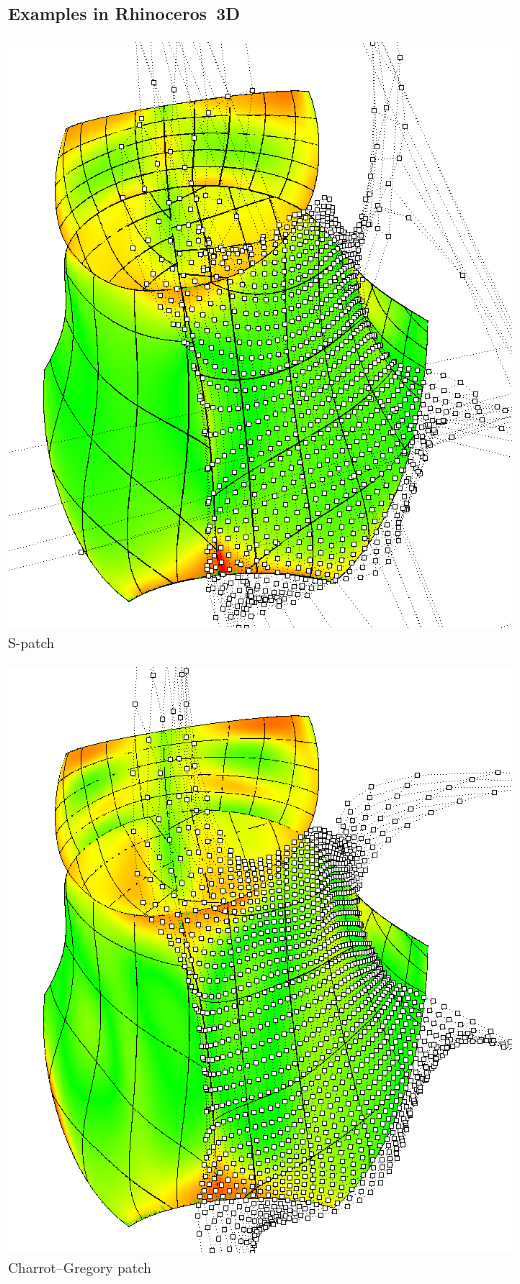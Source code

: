 \documentclass[xcolor=table]{beamer}
\begin{document}
\begin{frame}
  \frametitle{Examples in Rhinoceros\textsuperscript\textregistered\ 3D}
  \parbox{.45\textwidth}{
    \centering
    \includegraphics[width=.45\textwidth]{images/cagd86/spatch1.png}\\
    S-patch
  }
  \hfill
  \parbox{.45\textwidth}{
    \centering
    \includegraphics[width=.45\textwidth]{images/cagd86/cg1.png}\\
    Charrot--Gregory patch
  }
\end{frame}
\end{document}
